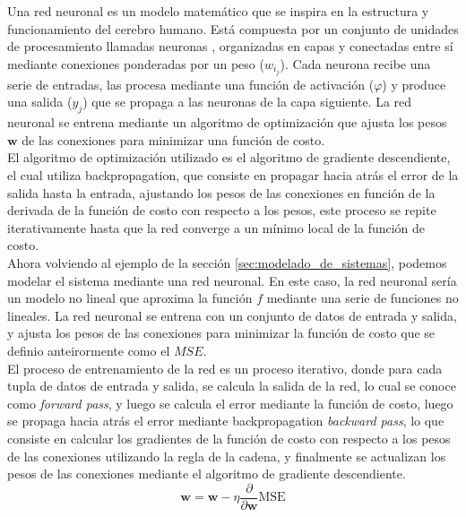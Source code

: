 Una red neuronal es un modelo matemático que se inspira en la estructura y funcionamiento del cerebro humano. Está compuesta por un conjunto de unidades de procesamiento llamadas neuronas , organizadas en capas y conectadas entre sí mediante conexiones ponderadas por un peso ($w_{i_j}$). Cada neurona recibe una serie de entradas, las procesa mediante una función de activación ($\varphi$) y produce una salida ($y_j$) que se propaga a las neuronas de la capa siguiente. La red neuronal se entrena mediante un algoritmo de optimización que ajusta los pesos $\mathbf{w}$ de las conexiones para minimizar una función de costo. \\



El algoritmo de optimización utilizado es el algoritmo de gradiente descendiente, el cual utiliza backpropagation, que consiste en propagar hacia atrás el error de la salida hasta la entrada, ajustando los pesos de las conexiones en función de la derivada de la función de costo con respecto a los pesos, este proceso se repite iterativamente hasta que la red converge a un mínimo local de la función de costo. \\

Ahora volviendo al ejemplo de la sección \ref{sec:modelado_de_sistemas}, podemos modelar el sistema mediante una red neuronal. En este caso, la red neuronal sería un modelo no lineal que aproxima la función $f$ mediante una serie de funciones no lineales. La red neuronal se entrena con un conjunto de datos de entrada y salida, y ajusta los pesos de las conexiones para minimizar la función de costo que se definio anteirormente como el $MSE$. \\

El proceso de entrenamiento de la red es un proceso iterativo, donde para cada tupla de datos de entrada y salida, se calcula la salida de la red, lo cual se conoce como \textit{forward pass}, y luego se calcula el error mediante la función de costo, luego se propaga hacia atrás el error mediante backpropagation \textit{backward pass}, lo que consiste en calcular los gradientes de la función de costo con respecto a los pesos de las conexiones utilizando la regla de la cadena, y finalmente se actualizan los pesos de las conexiones mediante el algoritmo de gradiente descendiente. \\

\begin{equation}
    \mathbf{w} = \mathbf{w} - \eta \frac{\partial}{\partial \mathbf{w}} \text{MSE}
\end{equation}

